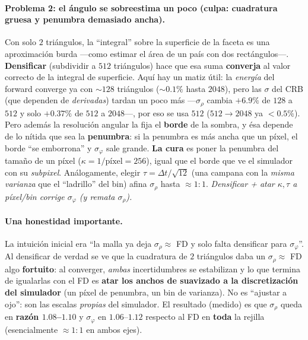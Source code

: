 \documentclass[11pt,a4paper]{article}
\begin{document}
\paragraph{Problema 2: el \'angulo se sobreestima un poco (culpa: cuadratura
gruesa y penumbra demasiado ancha).} Con solo $2$ tri\'angulos, la ``integral''
sobre la superficie de la faceta es una aproximaci\'on burda ---como estimar el
\'area de un pa\'is con dos rect\'angulos---. \textbf{Densificar} (subdividir a
$512$ tri\'angulos) hace que esa suma \textbf{converja} al valor correcto de la
integral de superficie. Aqu\'i hay un matiz \'util: la \emph{energ\'ia} del forward
converge ya con $\sim\!128$ tri\'angulos ($\sim\!0.1\%$ hasta $2048$), pero las
$\sigma$ del CRB (que dependen de \emph{derivadas}) tardan un poco m\'as
---$\sigma_\rho$ cambia $+6.9\%$ de $128$ a $512$ y solo $+0.37\%$ de $512$ a
$2048$---, por eso se usa $512$ ($512\to2048$ ya $<0.5\%$). Pero adem\'as la
resoluci\'on angular la fija el \textbf{borde} de la
sombra, y \'esa depende de lo n\'itida que sea la \textbf{penumbra}: si la penumbra
es m\'as ancha que un p\'ixel, el borde ``se emborrona'' y $\sigma_\varphi$ sale
grande. \textbf{La cura} es poner la penumbra del tama\~no de un p\'ixel
($\kappa=1/\text{p\'ixel}=256$), igual que el borde que ve el simulador con su
\emph{subpixel}. An\'alogamente, elegir $\tau=\Delta t/\sqrt{12}$ (una campana con
la \emph{misma varianza} que el ``ladrillo'' del bin) afina $\sigma_\rho$ hasta
$\approx1{:}1$. \emph{Densificar + atar $\kappa,\tau$ a p\'ixel/bin corrige
$\sigma_\varphi$ (y remata $\sigma_\rho$).}

\paragraph{Una honestidad importante.} La intuici\'on inicial era ``la malla ya
deja $\sigma_\rho\approx$ FD y solo falta densificar para $\sigma_\varphi$''. Al
densificar de verdad se ve que la cuadratura de $2$ tri\'angulos daba un
$\sigma_\rho\approx$ FD algo \textbf{fortuito}: al converger, \emph{ambas}
incertidumbres se estabilizan y lo que termina de igualarlas con el FD es
\textbf{atar los anchos de suavizado a la discretizaci\'on del simulador} (un
p\'ixel de penumbra, un bin de varianza). No es ``ajustar a ojo'': son las escalas
\emph{propias} del simulador. El resultado (medido) es que $\sigma_\rho$ queda en
\textbf{raz\'on $1.08$--$1.10$} y $\sigma_\varphi$ en $1.06$--$1.12$ respecto al FD
en \textbf{toda} la rejilla (esencialmente $\approx1{:}1$ en ambos ejes).
\end{document}
